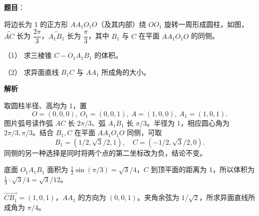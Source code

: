 \begin{answer}

\textbf{题目}：

将边长为 1 的正方形 \(AA_1O_1O\)（及其内部）绕 \(OO_1\) 旋转一周形成圆柱，如图，\(\overset{\frown}{AC}\) 长为 \(\dfrac{2\pi}{3}\)，\(\overset{\frown}{A_1B_1}\) 长为 \(\dfrac{\pi}{3}\)，其中 \(B_1\) 与 \(C\) 在平面 \(AA_1O_1O\) 的同侧。

（1） 求三棱锥 \(C-O_1A_1B_1\) 的体积。

（2） 求异面直线 \(B_1C\) 与 \(AA_1\) 所成角的大小。
\nopagebreak[4]
\begin{center}\end{center}
\nopagebreak[4]
\textbf{解析}

取圆柱半径、高均为 \(1\)，置
\nopagebreak[4]
\[
O=(0,0,0),\ O_1=(0,0,1),\ A=(1,0,0),\ A_1=(1,0,1).
\]
图片弧号读作弧 \(AC\) 长 \(2\pi/3\)、弧 \(A_1B_1\) 长 \(\pi/3\)。半径为 \(1\)，相应圆心角为 \(2\pi/3,\pi/3\)。结合 \(B_1,C\) 在平面 \(AA_1O_1O\) 同侧，可取
\nopagebreak[4]
\[
B_1=(1/2,\sqrt3/2,1),\quad C=(-1/2,\sqrt3/2,0).
\]
同侧的另一种选择是同时将两个点的第二坐标改为负，结论不变。

底面 \(O_1A_1B_1\) 面积为 \(\frac12\sin(\pi/3)=\sqrt3/4\)，\(C\) 到顶平面的距离为 \(1\)，所以体积为 \(\frac13\cdot\sqrt3/4=\sqrt3/12\)。

\(\overrightarrow{CB_1}=(1,0,1)\)，\(AA_1\) 的方向为 \((0,0,1)\)。夹角余弦为 \(1/\sqrt2\)，所求异面直线所成角为 \(\pi/4\)。



\end{answer}
